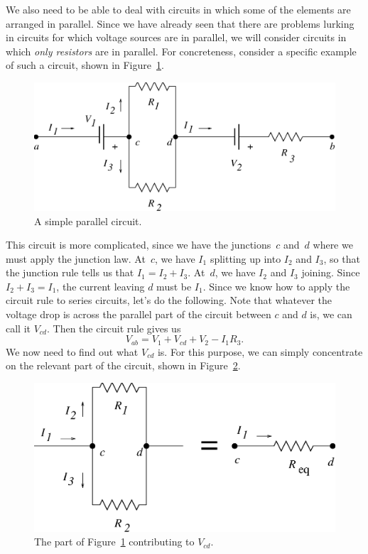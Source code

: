 We also need to be able to deal with circuits in which some of the elements are
arranged in parallel. Since we have already seen that there are problems 
lurking in circuits for which voltage sources are in parallel, we will consider
circuits in which {\it only resistors} are in parallel. For concreteness, 
consider a specific example of such a circuit, shown in 
Figure~\ref{fig:DC:parallel1}.
\begin{figure}[htb]
\centering \epsfxsize=12cm \includegraphics[scale=0.6]{2_dc/parallel1.eps}
\caption{A simple parallel circuit.}
\label{fig:DC:parallel1}
\end{figure}
This circuit is more complicated, since we have the junctions~$c$ and~$d$ where
we must apply the junction law. At~$c$, we have $I_1$ splitting up into $I_2$ 
and $I_3$, so that the junction rule tells us that $I_1=I_2+I_3$. At~$d$, we 
have $I_2$ and $I_3$ joining. Since $I_2+I_3=I_1$, the current leaving $d$ 
must be $I_1$.  Since we know how to apply the circuit rule to series circuits,
let's do the following. Note that whatever the voltage drop is across the 
parallel part of the circuit between $c$ and $d$ is, we can call it $V_{cd}$. 
Then the circuit rule gives us
\begin{equation}
V_{ab}= V_1 + V_{cd} + V_2 - I_1R_3.  \label{eq:DC:parallel1}
\end{equation}
We now need to find out what $V_{cd}$ is.  For this purpose, we can 
simply concentrate on the relevant part of the circuit, shown in 
Figure~\ref{fig:DC:parallel2}.
\begin{figure}[htb]
\centering \epsfxsize=10cm \includegraphics[scale=0.6]{2_dc/parallel2.eps}
\caption{The part of Figure~\ref{fig:DC:parallel1} contributing to $V_{cd}$.}
\label{fig:DC:parallel2}
\end{figure}
